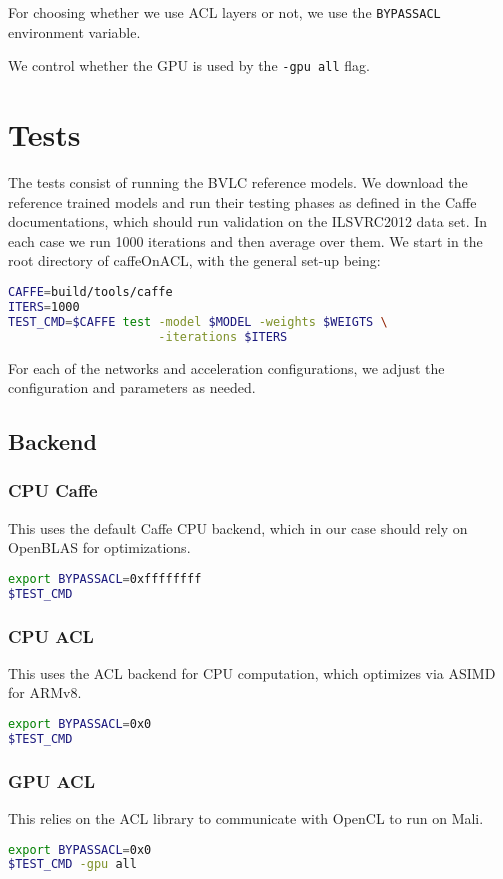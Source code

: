 \documentclass[12pt, a4paper, notitlepage]{report}
\begin{document}
For choosing whether we use ACL layers or not, we use the \verb|BYPASSACL| environment variable.

We control whether the GPU is used by the \verb|-gpu all| flag.\cite{coacl}

\section*{Tests}
The tests consist of running the BVLC reference models. We download the reference trained models and run their testing phases as defined in the Caffe documentations, which should run validation on the ILSVRC2012 data set. In each case we run 1000 iterations and then average over them.\cite{caffe}
We start in the root directory of caffeOnACL, with the general set-up being:
\begin{lstlisting}[language=bash]
CAFFE=build/tools/caffe
ITERS=1000
TEST_CMD=$CAFFE test -model $MODEL -weights $WEIGTS \
                     -iterations $ITERS
\end{lstlisting}
For each of the networks and acceleration configurations, we adjust the configuration and parameters as needed.
\subsection*{Backend}
\subsubsection*{CPU Caffe}
This uses the default Caffe CPU backend, which in our case should rely on OpenBLAS for optimizations.
\begin{lstlisting}[language=bash]
export BYPASSACL=0xffffffff
$TEST_CMD
\end{lstlisting}

\subsubsection*{CPU ACL}
This uses the ACL backend for CPU computation, which optimizes via ASIMD for ARMv8.\cite{acl}
\begin{lstlisting}[language=bash]
export BYPASSACL=0x0
$TEST_CMD
\end{lstlisting}

\subsubsection*{GPU ACL}
This relies on the ACL library to communicate with OpenCL to run on Mali.\cite{acl}
\begin{lstlisting}[language=bash]
export BYPASSACL=0x0
$TEST_CMD -gpu all
\end{lstlisting}
\end{document}
